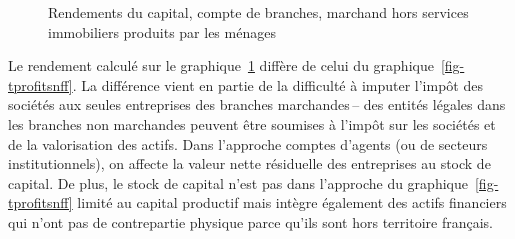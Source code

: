 \documentclass[
  french,
  9pt,
  a4paper,
]{article}
\begin{document}
\begin{figure}[H]

\caption{\label{fig-tprofitbranches}Rendements du capital, compte de
branches, marchand hors services immobiliers produits par les ménages}


\end{figure}%

Le rendement calculé sur le graphique~\ref{fig-tprofitbranches} diffère
de celui du graphique~\ref{fig-tprofitsnff}. La différence vient en
partie de la difficulté à imputer l'impôt des sociétés aux seules
entreprises des branches marchandes\,-- des entités légales dans les
branches non marchandes peuvent être soumises à l'impôt sur les sociétés
et de la valorisation des actifs. Dans l'approche comptes d'agents (ou
de secteurs institutionnels), on affecte la valeur nette résiduelle des
entreprises au stock de capital. De plus, le stock de capital n'est pas
dans l'approche du graphique~\ref{fig-tprofitsnff} limité au capital
productif mais intègre également des actifs financiers qui n'ont pas de
contrepartie physique parce qu'ils sont hors territoire français.
\end{document}
